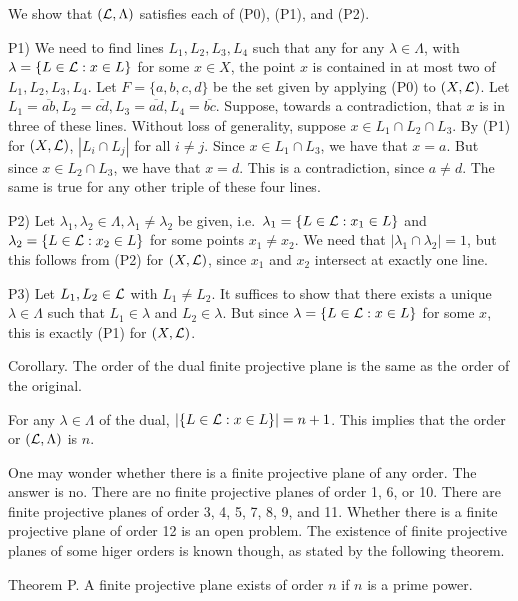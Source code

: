 \proof We show that $({\cal L}, \Lambda)$ satisfies each of (P0), (P1), and (P2).
\medskip
\item {P1)} We need to find lines $L_1, L_2, L_3, L_4$ such that any for any $\lambda\in \Lambda$, with $\lambda = \{L\in {\cal L} : x\in L\}$ for some $x\in X$, the point $x$ is contained in at most two of $L_1, L_2, L_3, L_4$. Let $F = \{a,b,c,d\}$ be the set given by applying (P0) to $(X,{\cal L})$. Let $L_1 = \overline{ab}, L_2 = \overline{cd}, L_3 = \overline{ad}, L_4 = \overline{bc}$. Suppose, towards a contradiction, that $x$ is in three of these lines. Without loss of generality, suppose $x\in L_1\cap L_2\cap L_3$. By (P1) for $(X,{\cal L})$, $|L_i\cap L_j|$ for all $i\neq j$. Since $x\in L_1\cap L_3$, we have that $x = a$. But since $x\in L_2\cap L_3$, we have that $x = d$. This is a contradiction, since $a\neq d$. The same is true for any other triple of these four lines.
\smallskip
\item {P2)} Let $\lambda_1,\lambda_2\in \Lambda, \lambda_1\neq\lambda_2$ be given, i.e.\  $\lambda_1 = \{ L\in {\cal L} : x_1\in L\}$ and $\lambda_2 = \{L\in {\cal L} : x_2\in L\}$ for some points $x_1\neq x_2$. We need that $|\lambda_1\cap\lambda_2| = 1$, but this follows from (P2) for $(X,{\cal L})$, since $x_1$ and $x_2$ intersect at exactly one line.
\smallskip
\item {P3)} Let $L_1, L_2\in {\cal L}$ with $L_1\neq L_2$. It suffices to show that there exists a unique $\lambda \in \Lambda$ such that $L_1\in \lambda$ and $L_2\in \lambda$. But since $\lambda = \{L\in {\cal L} : x\in L\}$ for some $x$, this is exactly (P1) for $(X,{\cal L})$.\slug

\proclaim Corollary. The order of the dual finite projective plane is the same as the order of the original.

\proof For any $\lambda \in \Lambda$ of the dual, $|\{L\in {\cal L} : x\in L\}| = n+1$. This implies that the order or $({\cal L}, \Lambda)$ is $n$.\slug

One may wonder whether there is a finite projective plane of any order. The answer is no. There are no finite projective planes of order 1, 6, or 10. There are finite projective planes of order 3, 4, 5, 7, 8, 9, and 11. Whether there is a finite projective plane of order 12 is an open problem. The existence of finite projective planes of some higer orders is known though, as stated by the following theorem.

\proclaim Theorem P. A finite projective plane exists of order $n$ if $n$ is a prime power.

